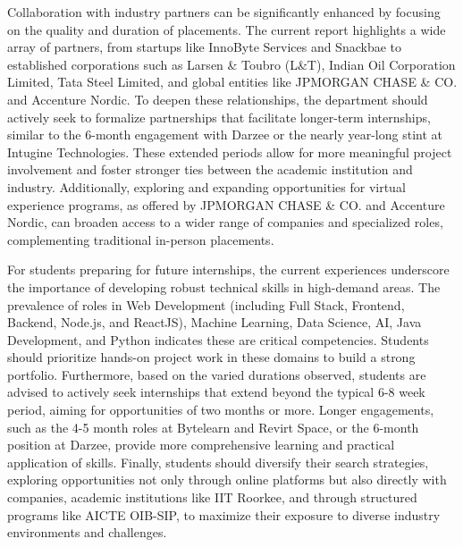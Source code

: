 \documentclass[11pt,a4paper]{article}
\newenvironment{card}{
    \begin{tcolorbox}[
        enhanced,
        colback=cardback,
        colframe=border,
        sharp corners,
        boxrule=0.5pt,
        drop shadow,
        shadow xshift=1mm,
        shadow yshift=-1mm,
        shadow color=border!50,
        boxsep=3mm,
        left=5mm, right=5mm, top=5mm, bottom=5mm,
        width=\textwidth,
        nobeforeafter
    ]
}{\end{tcolorbox}}
\begin{document}
\begin{card}
    Collaboration with industry partners can be significantly enhanced by focusing on the quality and duration of placements. The current report highlights a wide array of partners, from startups like InnoByte Services and Snackbae to established corporations such as Larsen \& Toubro (L\&T), Indian Oil Corporation Limited, Tata Steel Limited, and global entities like JPMORGAN CHASE \& CO. and Accenture Nordic. To deepen these relationships, the department should actively seek to formalize partnerships that facilitate longer-term internships, similar to the 6-month engagement with Darzee or the nearly year-long stint at Intugine Technologies. These extended periods allow for more meaningful project involvement and foster stronger ties between the academic institution and industry. Additionally, exploring and expanding opportunities for virtual experience programs, as offered by JPMORGAN CHASE \& CO. and Accenture Nordic, can broaden access to a wider range of companies and specialized roles, complementing traditional in-person placements.

    For students preparing for future internships, the current experiences underscore the importance of developing robust technical skills in high-demand areas. The prevalence of roles in Web Development (including Full Stack, Frontend, Backend, Node.js, and ReactJS), Machine Learning, Data Science, AI, Java Development, and Python indicates these are critical competencies. Students should prioritize hands-on project work in these domains to build a strong portfolio. Furthermore, based on the varied durations observed, students are advised to actively seek internships that extend beyond the typical 6-8 week period, aiming for opportunities of two months or more. Longer engagements, such as the 4-5 month roles at Bytelearn and Revirt Space, or the 6-month position at Darzee, provide more comprehensive learning and practical application of skills. Finally, students should diversify their search strategies, exploring opportunities not only through online platforms but also directly with companies, academic institutions like IIT Roorkee, and through structured programs like AICTE OIB-SIP, to maximize their exposure to diverse industry environments and challenges.
\end{card}

\vspace{0.5cm}
\end{document}
